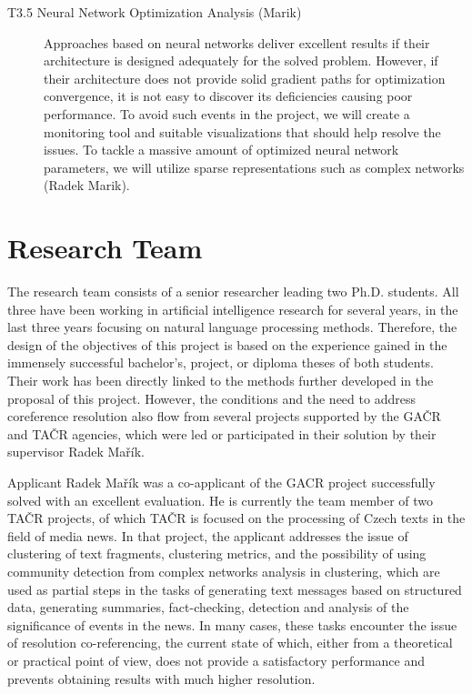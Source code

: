 \begin{description}
	\item [T3.5 Neural Network Optimization Analysis  (Marik)] Approaches based on neural networks deliver excellent results if their architecture is designed adequately for the solved problem. However, if their architecture does not provide solid gradient paths for optimization convergence, it is not easy to discover its deficiencies causing poor performance. To avoid such events in the project, we will create a monitoring tool and suitable visualizations that should help resolve the issues. To tackle a massive amount of optimized neural network parameters, we will utilize sparse representations such as complex networks (Radek Marik).

\end{description}


\section{Research Team}\label{sec:research_team}

The research team consists of a senior researcher leading two Ph.D. students. All three have been working in artificial intelligence research for several years, in the last three years focusing on natural language processing methods. Therefore, the design of the objectives of this project is based on the experience gained in the immensely successful bachelor's, project, or diploma theses of both students. Their work has been directly linked to the methods further developed in the proposal of this project. However, the conditions and the need to address coreference resolution also flow from several projects supported by the GAČR and TAČR agencies, which were led or participated in their solution by their supervisor Radek Mařík.

Applicant Radek Mařík was a co-applicant of the GACR project successfully solved with an excellent evaluation. He is currently the team member of two TAČR projects, of which TAČR is focused on the processing of Czech texts in the field of media news. In that project, the applicant addresses the issue of clustering of text fragments, clustering metrics, and the possibility of using community detection from complex networks analysis in clustering, which are used as partial steps in the tasks of generating text messages based on structured data, generating summaries, fact-checking, detection and analysis of the significance of events in the news. In many cases, these tasks encounter the issue of resolution co-referencing, the current state of which, either from a theoretical or practical point of view, does not provide a satisfactory performance and prevents obtaining results with much higher resolution.

